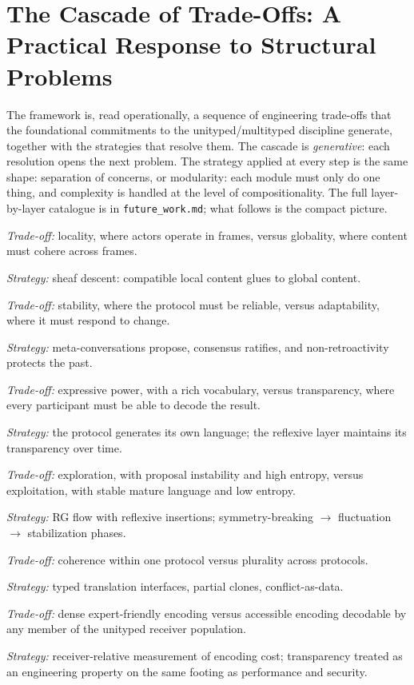 \documentclass[11pt]{article}
\newenvironment{annotatedlist}{%
  \begin{description}[
    style=nextline,
    leftmargin=0pt,
    labelindent=0pt,
    labelsep=0pt,
    font=\normalfont\bfseries,
    itemsep=0.85em,
    topsep=0.35em
  ]%
}{\end{description}}
\newcommand{\annotation}[2]{\par\textit{#1:} #2}
\begin{document}
\section{The Cascade of Trade-Offs: A Practical Response to Structural Problems}

The framework is, read operationally, a sequence of engineering trade-offs that
the foundational commitments to the unityped/multityped discipline generate,
together with the strategies that resolve them. The cascade is
\emph{generative}: each resolution opens the next problem. The strategy applied
at every step is the same shape: separation of concerns, or modularity: each
module must only do one thing, and complexity is handled at the level of
compositionality. The full layer-by-layer catalogue is in
\texttt{future\_work.md}; what follows is the compact picture.

\begin{annotatedlist}
\item[Hybrid]
\annotation{Trade-off}{locality, where actors operate in frames, versus globality, where content must cohere across frames.}
\annotation{Strategy}{sheaf descent: compatible local content glues to global content.}

\item[Reflexive (\(\Pi\))]
\annotation{Trade-off}{stability, where the protocol must be reliable, versus adaptability, where it must respond to change.}
\annotation{Strategy}{meta-conversations propose, consensus ratifies, and non-retroactivity protects the past.}

\item[Bulk (\(\Lambda\))]
\annotation{Trade-off}{expressive power, with a rich vocabulary, versus transparency, where every participant must be able to decode the result.}
\annotation{Strategy}{the protocol generates its own language; the reflexive layer maintains its transparency over time.}

\item[Field-theoretic dynamics]
\annotation{Trade-off}{exploration, with proposal instability and high entropy, versus exploitation, with stable mature language and low entropy.}
\annotation{Strategy}{RG flow with reflexive insertions; symmetry-breaking \(\to\) fluctuation \(\to\) stabilization phases.}

\item[Federation]
\annotation{Trade-off}{coherence within one protocol versus plurality across protocols.}
\annotation{Strategy}{typed translation interfaces, partial clones, conflict-as-data.}

\item[Information cohomology]
\annotation{Trade-off}{dense expert-friendly encoding versus accessible encoding decodable by any member of the unityped receiver population.}
\annotation{Strategy}{receiver-relative measurement of encoding cost; transparency treated as an engineering property on the same footing as performance and security.}
\end{annotatedlist}
\end{document}
